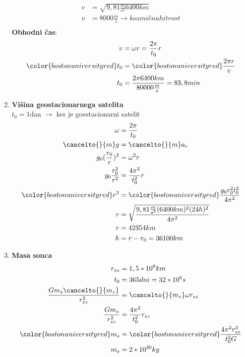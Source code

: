 \begin{enumerate}
\begin{align*}
			v &= \sqrt{9,81\frac{m}{s^2}6400km}\\
			v &= 8000 \frac{m}{s} \rightarrow kozmična hitrost\\
		\end{align*}
		\textbf{Obhodni čas}:
		\begin{align*}
			v &= \omega r = \frac{2\pi}{t_0}r\\ 
			{\color{bostonuniversityred}t_0} &= {\color{bostonuniversityred}\frac{2\pi r}{v}}\\
			t_0 &= \frac{2\pi 6400km}{80000\frac{m}{s}} = 83,8 min
		\end{align*}
	\item \textbf{Višina geostacionarnega satelita}\\
		$t_0 = 1$dan $\rightarrow$ ker je goestacionarni satelit\\
		\begin{align*}
			\omega &= \frac{2\pi}{t_0}\\
			{\cancelto{}{m}}g &= {\cancelto{}{m}}a_r\\
			g_0(\frac{r_0}{r})^2 &= \omega^2 r\\
			g_0\frac{r_0^2}{r^2} &= \frac{4\pi^2}{t_0^2}r\\
			{\color{bostonuniversityred}r^3} &= {\color{bostonuniversityred}\frac{g_0r_0^2t_0^2}{4\pi^2}}\\
			r &= \sqrt{\frac{9,81\frac{m}{s^2}(6400km)^2(24h)^2}{4\pi^2}}\\
			r &= 42354km\\
			h &= r - r_0 = 36100km
		\end{align*}
	\item \textbf{Masa sonca}\\
		\begin{align*}
			r_{sz} &= 1,5 * 10^8km\\
			t_0 &= 365dni = 32 *10^6s\\
			\frac{Gm_s{\cancelto{}{m_z}}}{r_{sz}^2} &= {\cancelto{}{m_z}}\omega r_{sz}\\
			\frac{Gm_s}{r_{sz}^2} &= \frac{4\pi^2}{t_0^2}r_{sz}\\
			{\color{bostonuniversityred}m_s} &= {\color{bostonuniversityred}\frac{4\pi^2 r_{sz}^3}{t_0^2 G}}\\
			m_s &= 2 * 10^{30}kg\\ 
		\end{align*}
\end{enumerate}
